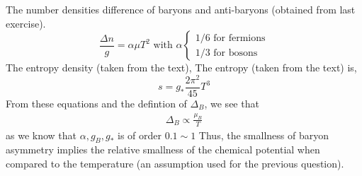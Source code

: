\begin{enumerate}[label=\alph*)]
The number densities difference of baryons and anti-baryons (obtained from last exercise).
	\begin{equation}
	\frac{\Delta n }{g} = \alpha \mu T^2 \text{ with } \alpha \begin{cases} 1/6 \text{ for fermions} \\ 1/3 \text{ for bosons} \end{cases}
	\end{equation}
The entropy density (taken from the text),
	The entropy (taken from the text) is,
	\begin{equation}
	s = g_\ast \frac{2\pi^2}{45}T^3
	\end{equation}
From these equations and the defintion of $\Delta_B$, we see that
   \begin{align}
      \Delta_B \propto \frac{\mu_B}{T}
   \end{align}
as we know that $\alpha, g_B, g_{\ast} $ is of order $0.1 \sim 1$
   Thus, the smallness of baryon asymmetry implies the relative smallness of the chemical potential when compared to the temperature (an assumption used for the previous question). 
\end{enumerate}
